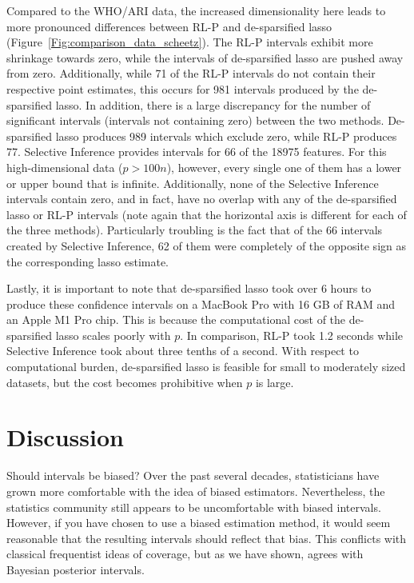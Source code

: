 Compared to the WHO/ARI data, the increased dimensionality here leads to more pronounced differences between RL-P and de-sparsified lasso (Figure~\ref{Fig:comparison_data_scheetz}). The RL-P intervals exhibit more shrinkage towards zero, while the intervals of de-sparsified lasso are pushed away from zero. Additionally, while 71 of the RL-P intervals do not contain their respective point estimates, this occurs for 981 intervals produced by the de-sparsified lasso. In addition, there is a large discrepancy for the number of significant intervals (intervals not containing zero) between the two methods. De-sparsified lasso produces 989 intervals which exclude zero, while RL-P produces 77. Selective Inference provides intervals for 66 of the 18975 features. For this high-dimensional data ($p > 100n$), however, every single one of them has a lower or upper bound that is infinite. Additionally, none of the Selective Inference intervals contain zero, and in fact, have no overlap with any of the de-sparsified lasso or RL-P intervals (note again that the horizontal axis is different for each of the three methods). Particularly troubling is the fact that of the 66 intervals created by Selective Inference, 62 of them were completely of the opposite sign as the corresponding lasso estimate.

Lastly, it is important to note that de-sparsified lasso took over 6 hours to produce these confidence intervals on a MacBook Pro with 16 GB of RAM and an Apple M1 Pro chip. This is because the computational cost of the de-sparsified lasso scales poorly with $p$. In comparison, RL-P took 1.2 seconds while Selective Inference took about three tenths of a second. With respect to computational burden, de-sparsified lasso is feasible for small to moderately sized datasets, but the cost becomes prohibitive when $p$ is large.

\section{Discussion} \label{Sec:discussion}

Should intervals be biased? Over the past several decades, statisticians have grown more comfortable with the idea of biased estimators. Nevertheless, the statistics community still appears to be uncomfortable with biased intervals. However, if you have chosen to use a biased estimation method, it would seem reasonable that the resulting intervals should reflect that bias. This conflicts with classical frequentist ideas of coverage, but as we have shown, agrees with Bayesian posterior intervals.

